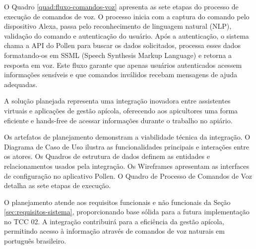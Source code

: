 \label{sec:fluxo-processamento}




O Quadro \ref{quad:fluxo-comandos-voz} apresenta as sete etapas do processo de execução de comandos de voz. O processo inicia com a captura do comando pelo dispositivo Alexa, passa pelo reconhecimento de linguagem natural (NLP), validação do comando e autenticação do usuário. Após a autenticação, o sistema chama a API do Pollen para buscar os dados solicitados, processa esses dados formatando-os em SSML (Speech Synthesis Markup Language) e retorna a resposta em voz. Este fluxo garante que apenas usuários autenticados acessem informações sensíveis e que comandos inválidos recebam mensagens de ajuda adequadas.


A solução planejada representa uma integração inovadora entre assistentes virtuais e aplicações de gestão apícola, oferecendo aos apicultores uma forma eficiente e hands-free de acessar informações durante o trabalho no apiário.

Os artefatos de planejamento demonstram a viabilidade técnica da integração. O Diagrama de Caso de Uso ilustra as funcionalidades principais e interações entre os atores. Os Quadros de estrutura de dados definem as entidades e relacionamentos usados pela integração. Os Wireframes apresentam as interfaces de configuração no aplicativo Pollen. O Quadro de Processo de Comandos de Voz detalha as sete etapas de execução.

O planejamento atende aos requisitos funcionais e não funcionais da Seção \ref{sec:requisitos-sistema}, proporcionando base sólida para a futura implementação no TCC 02. A integração contribuirá para a eficiência da gestão apícola, permitindo acesso à informação através de comandos de voz naturais em português brasileiro.